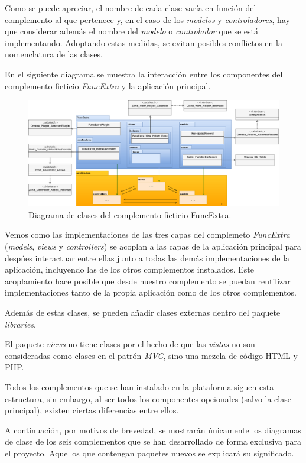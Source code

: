\documentclass[
]{article}
\begin{document}
Como se puede apreciar, el nombre de cada clase varía en función del
complemento al que pertenece y, en el caso de los \emph{modelos} y
\emph{controladores}, hay que considerar además el nombre del
\emph{modelo} o \emph{controlador} que se está implementando. Adoptando
estas medidas, se evitan posibles conflictos en la nomenclatura de las
clases.

En el siguiente diagrama se muestra la interacción entre los componentes
del complemento ficticio \emph{FuncExtra} y la aplicación principal.

\begin{figure}
\hypertarget{da-pck-4}{%
\centering
\includegraphics{../_static/images/pck-4.png}
\caption{Diagrama de clases del complemento ficticio
FuncExtra.}\label{da-pck-4}
}
\end{figure}

Vemos como las implementaciones de las tres capas del complemeto
\emph{FuncExtra} (\emph{models}, \emph{views} y \emph{controllers}) se
acoplan a las capas de la aplicación principal para despúes interactuar
entre ellas junto a todas las demás implementaciones de la aplicación,
incluyendo las de los otros complementos instalados. Este acoplamiento
hace posible que desde nuestro complemento se puedan reutilizar
implementaciones tanto de la propia aplicación como de los otros
complementos.

Además de estas clases, se pueden añadir clases externas dentro del
paquete \emph{libraries}.

El paquete \emph{views} no tiene clases por el hecho de que las
\emph{vistas} no son consideradas como clases en el patrón \emph{MVC},
sino una mezcla de código HTML y PHP.

Todos los complementos que se han instalado en la plataforma siguen esta
estructura, sin embargo, al ser todos los componentes opcionales (salvo
la clase principal), existen ciertas diferencias entre ellos.

A continuación, por motivos de brevedad, se mostrarán únicamente los
diagramas de clase de los seis complementos que se han desarrollado de
forma exclusiva para el proyecto. Aquellos que contengan paquetes nuevos
se explicará su significado.
\end{document}
